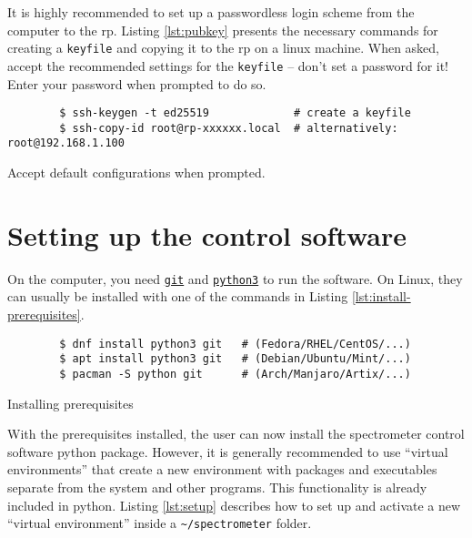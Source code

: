 It is highly recommended to set up a passwordless login scheme from the computer to the \acrshort{rp}. Listing \ref{lst:pubkey} presents the necessary commands for creating a \lstinline{keyfile} and copying it to the \acrshort{rp} on a \acrshort{linux} machine. When asked, accept the recommended settings for the \lstinline{keyfile} -- don't set a password for it! Enter your password when prompted to do so.

\begin{listing}[h!bt]
    \begin{verbatim}
        $ ssh-keygen -t ed25519             # create a keyfile
        $ ssh-copy-id root@rp-xxxxxx.local  # alternatively: root@192.168.1.100
    \end{verbatim}
    \caption{ Accept default configurations when prompted.}
    \label{lst:pubkey}
\end{listing}

\section{Setting up the control software}
On the computer, you need \href{https://git-scm.com/}{\lstinline{git}} and \href{https://www.python.org/}{\lstinline{python3}} to run the software. On Linux, they can usually be installed with one of the commands in Listing \ref{lst:install-prerequisites}.

\begin{listing}[h!bt]
    \begin{verbatim}
        $ dnf install python3 git   # (Fedora/RHEL/CentOS/...)
        $ apt install python3 git   # (Debian/Ubuntu/Mint/...)
        $ pacman -S python git      # (Arch/Manjaro/Artix/...)
    \end{verbatim}
    \caption{Installing prerequisites}
    \label{lst:install-prerequisites}
\end{listing}

With the prerequisites installed, the user can now install the spectrometer control software \gls{python} package. However, it is generally recommended to use \enquote{virtual environments} that create a new environment with packages and executables separate from the system and other programs. This functionality is already included in \gls{python}. Listing \ref{lst:setup} describes how to set up and activate a new \enquote{virtual environment} inside a \lstinline{~/spectrometer} folder.

